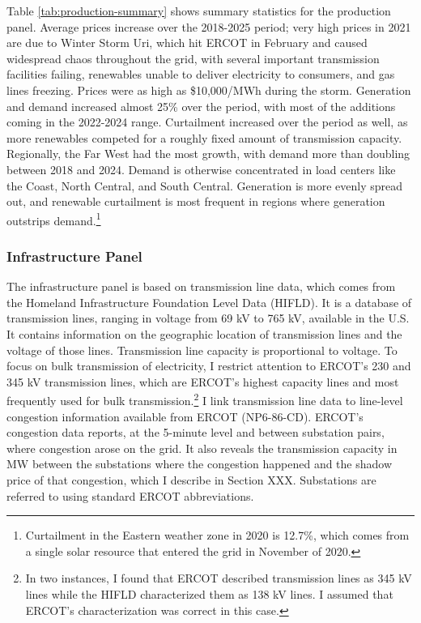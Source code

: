 \documentclass[12pt]{article}
\begin{document}
Table \ref{tab:production-summary} shows summary statistics for the production panel. Average prices increase over the 2018-2025 period; very high prices in 2021 are due to Winter Storm Uri, which hit ERCOT in February and caused widespread chaos throughout the grid, with several important transmission facilities failing, renewables unable to deliver electricity to consumers, and gas lines freezing. Prices were as high as \$10,000/MWh during the storm. Generation and demand increased almost 25\% over the period, with most of the additions coming in the 2022-2024 range. Curtailment increased over the period as well, as more renewables competed for a roughly fixed amount of transmission capacity. Regionally, the Far West had the most growth, with demand more than doubling between 2018 and 2024. Demand is otherwise concentrated in load centers like the Coast, North Central, and South Central. Generation is more evenly spread out, and renewable curtailment is most frequent in regions where generation outstrips demand.\footnote{Curtailment in the Eastern weather zone in 2020 is 12.7\%, which comes from a single solar resource that entered the grid in November of 2020.}

\subsubsection{Infrastructure Panel}
\label{sec:infrastructure}
The infrastructure panel is based on transmission line data, which comes from the Homeland Infrastructure Foundation Level Data (HIFLD). It is a database of transmission lines, ranging in voltage from 69 kV to 765 kV, available in the U.S. It contains information on the geographic location of transmission lines and the voltage of those lines. Transmission line capacity is proportional to voltage. To focus on bulk transmission of electricity, I restrict attention to ERCOT's 230 and 345 kV transmission lines, which are ERCOT's highest capacity lines and most frequently used for bulk transmission.\footnote{In two instances, I found that ERCOT described transmission lines as 345 kV lines while the HIFLD characterized them as 138 kV lines. I assumed that ERCOT's characterization was correct in this case.} I link transmission line data to line-level congestion information available from ERCOT (NP6-86-CD). ERCOT's congestion data reports, at the 5-minute level and between substation pairs, where congestion arose on the grid. It also reveals the transmission capacity in MW between the substations where the congestion happened and the shadow price of that congestion, which I describe in Section XXX. Substations are referred to using standard ERCOT abbreviations.
\end{document}
